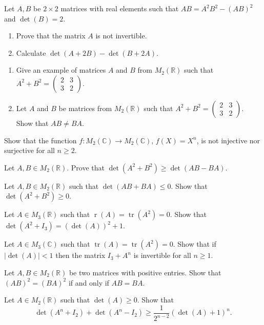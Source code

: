 \documentclass[12pt]{article}
\begin{document}
\begin{problems}
\item Let $A,B$ be $2\times 2$ matrices with real elements such that $AB=A^2B^2-(AB)^2$ and $\det(B)=2$.
\begin{enumerate}[label=(\alph*)]
\item Prove that the matrix $A$ is not invertible.
\item Calculate $\det(A+2B) - \det(B+2A)$.
\end{enumerate}

\item
\begin{enumerate}[label=(\alph*)]
\item Give an example of matrices $A$ and $B$ from $M_2(\mathbb{R})$ such that $A^2+B^2 = \begin{pmatrix}2 & 3\\ 3 & 2\end{pmatrix}$.
\item Let $A$ and $B$ be matrices from $M_2(\mathbb{R})$ such that $A^2+B^2=\begin{pmatrix}2 & 3\\ 3 & 2\end{pmatrix}$. Show that $AB\ne BA$.
\end{enumerate}

\item Show that the function $f:M_2(\mathbb{C})\to M_2(\mathbb{C})$, $f(X)=X^n$, is not injective nor surjective for all $n\ge 2$.

\item Let $A,B\in M_2(\mathbb{R})$. Prove that $\det(A^2+B^2) \ge \det(AB-BA)$.

\item Let $A,B\in M_2(\mathbb{R})$ such that $\det(AB+BA)\le 0$. Show that $\det(A^2+B^2)\ge 0$.

\item Let $A\in M_3(\mathbb{R})$ such that $\operatorname{r}(A)=\operatorname{tr}(A^2)=0$. Show that $\det(A^2+I_3) = (\det(A))^2+1$.

\item Let $A\in M_3(\mathbb{C})$ such that $\operatorname{tr}(A)=\operatorname{tr}(A^2)=0$. Show that if $|\det(A)|<1$ then the matrix $I_3+A^n$ is invertible for all $n\ge 1$.

\item Let $A,B\in M_2(\mathbb{R})$ be two matrices with positive entries. Show that $(AB)^2=(BA)^2$ if and only if $AB=BA$.

\item Let $A\in M_2(\mathbb{R})$ such that $\det(A)\ge 0$. Show that
\[
\det(A^n+I_2) + \det(A^n-I_2) \ge \frac{1}{2^{n-2}}(\det(A)+1)^n.
\]


\end{problems}
\end{document}
